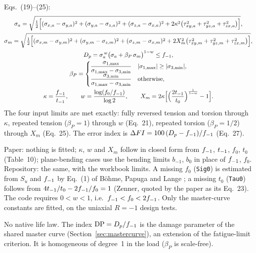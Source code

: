  Eqs.~(19)--(25):
\begin{gather}
\sigma_a = \sqrt{\tfrac12\Bigl[(\sigma_{x,a}-\sigma_{y,a})^2 + (\sigma_{y,a}-\sigma_{z,a})^2 + (\sigma_{z,a}-\sigma_{x,a})^2
 + 2\kappa^2\bigl(\tau_{xy,a}^2+\tau_{yz,a}^2+\tau_{zx,a}^2\bigr)\Bigr]} , \label{eq:mmp-sa}\\
\sigma_m = \sqrt{\tfrac12\Bigl[(\sigma_{x,m}-\sigma_{y,m})^2 + (\sigma_{y,m}-\sigma_{z,m})^2 + (\sigma_{z,m}-\sigma_{x,m})^2
 + 2X_m^2\bigl(\tau_{xy,m}^2+\tau_{yz,m}^2+\tau_{zx,m}^2\bigr)\Bigr]} , \label{eq:mmp-sm}\\
D_p = \sigma_a^{\,w}\bigl(\sigma_a + \beta_P\,\sigma_m\bigr)^{1-w} \le f_{-1} , \label{eq:mmp-main}\\
\beta_P = \begin{cases}
\dfrac{\sigma_{1,\max}}{\sigma_{1,\max}-\sigma_{3,\min}} & |\sigma_{1,\max}|\ge|\sigma_{3,\min}| ,\\[2mm]
\dfrac{\sigma_{3,\min}}{\sigma_{1,\max}-\sigma_{3,\min}} & \text{otherwise},
\end{cases} \label{eq:mmp-beta}\\
\kappa = \frac{f_{-1}}{t_{-1}} , \qquad w = \frac{\log(f_0/f_{-1})}{\log 2} , \qquad
X_m = 2\kappa\Bigl[\Bigl(\frac{2t_{-1}}{t_0}\Bigr)^{\frac{1}{1-w}} - 1\Bigr] . \label{eq:mmp-const}
\end{gather}
The four input limits are met exactly: fully reversed tension and torsion through $\kappa$, repeated
tension ($\beta_P=1$) through $w$ (Eq.~21), repeated torsion ($\beta_P=1/2$) through $X_m$ (Eq.~25). The
error index is $\Delta FI=100\,(D_p-f_{-1})/f_{-1}$ (Eq.~27).

 Paper: nothing is fitted; $\kappa$, $w$ and $X_m$ follow in closed form
from $f_{-1}$, $t_{-1}$, $f_0$, $t_0$ (Table~10); plane-bending cases use the bending limits $b_{-1}$, $b_0$
in place of $f_{-1}$, $f_0$. Repository: the same, with the workbook limits. A missing $f_0$
(\texttt{Sig0}) is estimated from $S_u$ and $f_{-1}$ by Eq.~(1) of B\"ohme, Papuga and Lange
\cite{bohme2026}; a missing $t_0$ (\texttt{Tau0}) follows from $4t_{-1}/t_0-2f_{-1}/f_0=1$ (Zenner, quoted by
the paper as its Eq.~23). The code requires $0<w<1$, i.e.\ $f_{-1}<f_0<2f_{-1}$. Only the master-curve
constants are fitted, on the uniaxial $R=-1$ design tests.

 No native life law. The index $\mathrm{DP}=D_p/f_{-1}$ is the damage parameter of the shared
master curve (Section~\ref{sec:mastercurve}), an extension of the fatigue-limit criterion. It is
homogeneous of degree~1 in the load ($\beta_P$ is scale-free).

